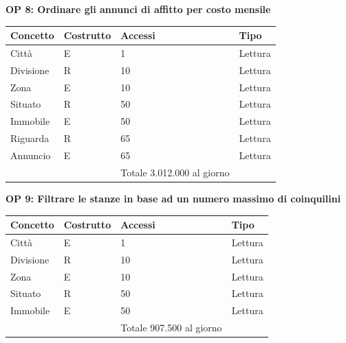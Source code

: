 \documentclass[a4paper,12pt]{report}
\begin{document}
            \textbf{OP 8: Ordinare gli annunci di affitto per costo mensile}
        	\begin{table}[h!]
            \centering
             \begin{tabular}{||l l l l||}
             \hline
             Concetto & Costrutto & Accessi & Tipo \\ [0.5ex] 
             \hline\hline
             Città & E & 1 & Lettura \\ 
             Divisione & R & 10 & Lettura \\ 
             Zona & E & 10 & Lettura \\ 
             Situato & R & 50 & Lettura \\ 
             Immobile & E & 50 & Lettura \\ 
             Riguarda & R & 65 & Lettura \\ 
             Annuncio & E & 65 & Lettura \\ 
             \hline
                &   & Totale  3.012.000 al giorno &  \\ [1ex] 
             \hline
             \end{tabular}
            \end{table}

            \textbf{OP 9: Filtrare le stanze in base ad un numero massimo di coinquilini}
        	\begin{table}[h!]
            \centering
             \begin{tabular}{||l l l l||}
             \hline
             Concetto & Costrutto & Accessi & Tipo \\ [0.5ex] 
             \hline\hline
             Città & E & 1 & Lettura \\ 
             Divisione & R & 10 & Lettura \\ 
             Zona & E & 10 & Lettura \\ 
             Situato & R & 50 & Lettura \\ 
             Immobile & E & 50 & Lettura \\ 
             \hline
                &   & Totale  907.500 al giorno &  \\ [1ex] 
             \hline
             \end{tabular}
            \end{table}
\end{document}
